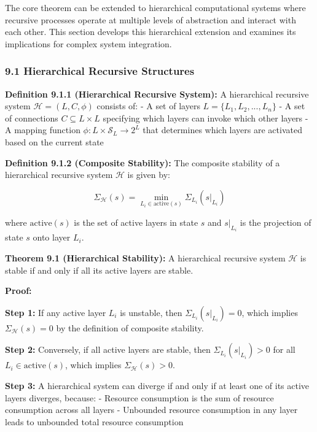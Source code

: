 \documentclass[
]{article}
\begin{document}
The core theorem can be extended to hierarchical computational systems
where recursive processes operate at multiple levels of abstraction and
interact with each other. This section develops this hierarchical
extension and examines its implications for complex system integration.

\subsubsection{9.1 Hierarchical Recursive
Structures}\label{hierarchical-recursive-structures}

\textbf{Definition 9.1.1 (Hierarchical Recursive System):} A
hierarchical recursive system \(\mathcal{H} = (L, C, \phi)\) consists
of: - A set of layers \(L = \{L_1, L_2, ..., L_n\}\) - A set of
connections \(C \subseteq L \times L\) specifying which layers can
invoke which other layers - A mapping function
\(\phi: L \times \mathcal{S}_L \rightarrow 2^L\) that determines which
layers are activated based on the current state

\textbf{Definition 9.1.2 (Composite Stability):} The composite stability
of a hierarchical recursive system \(\mathcal{H}\) is given by:

\[\Sigma_{\mathcal{H}}(s) = \min_{L_i \in \text{active}(s)} \Sigma_{L_i}(s|_{L_i})\]

where \(\text{active}(s)\) is the set of active layers in state \(s\)
and \(s|_{L_i}\) is the projection of state \(s\) onto layer \(L_i\).

\textbf{Theorem 9.1 (Hierarchical Stability):} A hierarchical recursive
system \(\mathcal{H}\) is stable if and only if all its active layers
are stable.

\textbf{Proof:}

\textbf{Step 1:} If any active layer \(L_i\) is unstable, then
\(\Sigma_{L_i}(s|_{L_i}) = 0\), which implies
\(\Sigma_{\mathcal{H}}(s) = 0\) by the definition of composite
stability.

\textbf{Step 2:} Conversely, if all active layers are stable, then
\(\Sigma_{L_i}(s|_{L_i}) > 0\) for all \(L_i \in \text{active}(s)\),
which implies \(\Sigma_{\mathcal{H}}(s) > 0\).

\textbf{Step 3:} A hierarchical system can diverge if and only if at
least one of its active layers diverges, because: - Resource consumption
is the sum of resource consumption across all layers - Unbounded
resource consumption in any layer leads to unbounded total resource
consumption
\end{document}
